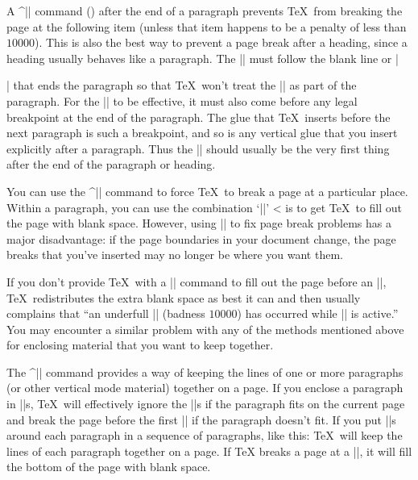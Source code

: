 A ^|\nobreak| command  ()
after the end of a paragraph prevents \TeX\
from breaking the page at the following item
(unless that item happens to be a penalty of less than $10000$).
This is also the best way to prevent a page break after a heading,
since a heading usually behaves like a paragraph.
The |\nobreak| must follow the blank line or |\par| that ends
the paragraph so that \TeX\ won't treat the |\nobreak| as part of the
paragraph.
For the |\nobreak| to be effective, it must also come before
any legal breakpoint at the end of the paragraph.
The glue that \TeX\ inserts
before the next paragraph is such a breakpoint,
and so is any vertical glue that you insert explicitly after a paragraph.
Thus the |\nobreak| should usually be
the very first thing after the end of the paragraph or heading.

You can use the ^|\eject| command \ctsref{\eject}
to force \TeX\ to break a page at a
particular place.  Within a paragraph, you can use the combination 
`|\vadjust{\vfill\eject}|' 
\ctsref{\vadjust}
^^| is to
get \TeX\ to fill out the page with blank space.  
However, using |\eject| to fix page break problems
has a major disadvantage:
if the page boundaries in your document change,
the page breaks that you've inserted may no longer be where you want them.

If you don't provide \TeX\ with a |\vfill| command to fill out the page
before an |\eject|,
\TeX\ redistributes the extra blank space as best it can and then usually
complains that ``an
underfull |\vbox| (badness $10000$) has occurred while |\output| is active.''
You may encounter a similar problem with
any of the methods mentioned above for enclosing
material that you want to keep together.

The ^|\filbreak| command \ctsref\filbreak{}
provides a way of keeping the lines of one or more paragraphs
(or other vertical mode material) together on
a page.  If you enclose a paragraph in |\filbreak|s, \TeX\ will effectively
ignore the |\filbreak|s if the paragraph fits on the current page and
break the page before the first |\filbreak| if the paragraph doesn't fit.
If you put |\filbreak|s around each paragraph in a sequence of paragraphs,
like this:
{\obeylines{}}
\vfil\eject
\noindent
\TeX\ will keep the lines of each paragraph together on a page.
If \TeX{} breaks a page at a |\filbreak|, it will fill the bottom of the
page with blank space.

